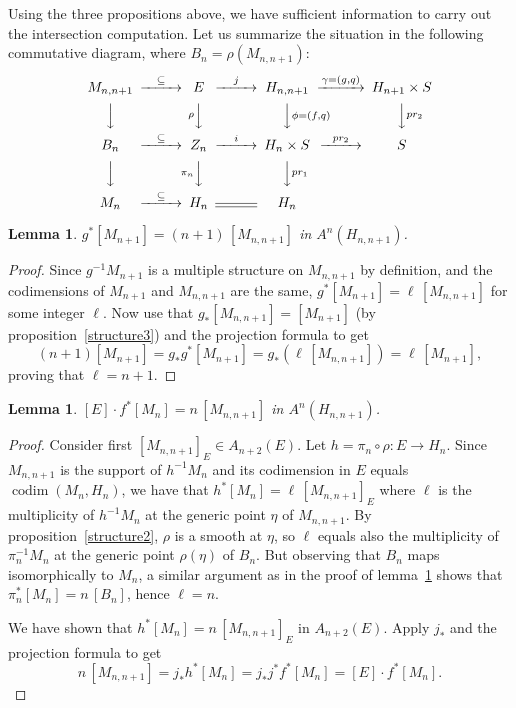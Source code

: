 \documentclass[12pt]{amsart}
\def\Hn{H_n}
\def\Hnn{H_{n,n+1}}
\def\Hnp{H_{n+1}}
\let\:=\colon
\def\i{^{-1}}
\def\x{\times}
\def\sub{\subseteq}
\def\codim{\operatorname{codim}}
\newtheorem{lemma}[thm]{Lemma}
\theoremstyle{definition}
\theoremstyle{remark}
\numberwithin{equation}{section}
\newcommand{\lemref}[1]{lemma~\ref{#1}}
\newcommand{\propref}[1]{proposition~\ref{#1}}
\begin{document}
Using the three propositions above, we have sufficient information to
carry out the intersection computation. Let us summarize the situation
in the following commutative diagram, where $B_n=\rho(M_{n,n+1})$:
\[
\begin{CD}
M_{n,n+1} @>\sub >> E    @>j>>    \Hnn     @>\gamma=(g,q)>>  \Hnp\x S \\
@VVV @V\rho VV  @VV\phi=(f,q) V @VV pr_2V \\
B_n @>\sub >> Z_n @>i>> \Hn\x S @> pr_2 >> S \\
@VVV @V\pi_n VV  @VV pr_1 V \\
M_n@>\sub>> \Hn @= \Hn
\end{CD}
\]
\begin{lemma}\label{lemmaa}
$     g^*[M_{n+1}] = (n+1)\,[M_{n,n+1}]$   in $A^n(\Hnn)$.
\end{lemma}
\begin{proof}

  Since $g\i M_{n+1}$ is a multiple structure on $M_{n,n+1}$ by
  definition, and the codimensions of $M_{n+1}$ and $M_{n,n+1}$ are
  the same, $g^*[M_{n+1}] = \ell\, [M_{n,n+1}]$ for some integer
  $\ell$. Now use that $g_*[M_{n,n+1}]=[M_{n+1}]$ (by
  \propref{structure3}) and the projection formula to get
 \[
   (n+1)[M_{n+1}] = g_* g^* [M_{n+1}] = g_* (\ell\, [M_{n,n+1}])=
   \ell\,[M_{n+1}],
 \]
 proving that $\ell=n+1$.
\end{proof}

\begin{lemma}\label{lemmab}
  $ [E]\cdot f^*[M_n] = n\,[M_{n,n+1}]$ in $A^n(\Hnn)$.
\end{lemma}
\begin{proof}
  Consider first $[M_{n,n+1}]_E\in A_{n+2}(E)$. Let $h=\pi_n\circ\rho\:
  E\to\Hn$. Since $M_{n,n+1}$ is the support of $h\i M_n$ and its
  codimension in $E$ equals $\codim(M_n,\Hn)$, we have that
  $h^*[M_n]=\ell\,[M_{n,n+1}]_E$ where $\ell$ is the multiplicity of
  $h\i M_n$ at the generic point $\eta$ of $M_{n,n+1}$. By
  \propref{structure2}, $\rho$ is a smooth at $\eta$, so $\ell$ equals
  also the multiplicity of $\pi_n\i M_n$ at the generic point
  $\rho(\eta)$ of $B_n$. But observing that $B_n$ maps isomorphically
  to $M_n$, a similar argument as in the proof of \lemref{lemmaa}
  shows that $\pi_n^*[M_n]=n\,[B_n]$, hence $\ell=n$.

  We have shown that $h^*[M_n] = n\,[M_{n,n+1}]_E$ in $A_{n+2}(E)$. Apply
  $j_*$ and the projection formula to get
  \[
  n\,[M_{n,n+1}] = j_*h^*[M_n]=j_*j^*f^*[M_n] = [E]\cdot f^*[M_n].
  \]
\end{proof}
\end{document}
